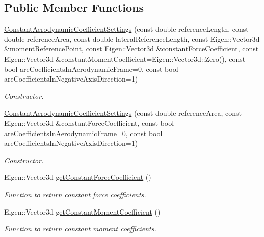 \subsection*{Public Member Functions}
\begin{DoxyCompactItemize}
\item 
\hyperlink{classtudat_1_1simulation__setup_1_1ConstantAerodynamicCoefficientSettings_ad9845f3663c017608d0f752aa43e3676}{Constant\+Aerodynamic\+Coefficient\+Settings} (const double reference\+Length, const double reference\+Area, const double lateral\+Reference\+Length, const Eigen\+::\+Vector3d \&moment\+Reference\+Point, const Eigen\+::\+Vector3d \&constant\+Force\+Coefficient, const Eigen\+::\+Vector3d \&constant\+Moment\+Coefficient=Eigen\+::\+Vector3d\+::\+Zero(), const bool are\+Coefficients\+In\+Aerodynamic\+Frame=0, const bool are\+Coefficients\+In\+Negative\+Axis\+Direction=1)
\begin{DoxyCompactList}\small\item\em Constructor. \end{DoxyCompactList}\item 
\hyperlink{classtudat_1_1simulation__setup_1_1ConstantAerodynamicCoefficientSettings_a4db8de40f3460d446d5cde28ca76fb36}{Constant\+Aerodynamic\+Coefficient\+Settings} (const double reference\+Area, const Eigen\+::\+Vector3d \&constant\+Force\+Coefficient, const bool are\+Coefficients\+In\+Aerodynamic\+Frame=0, const bool are\+Coefficients\+In\+Negative\+Axis\+Direction=1)
\begin{DoxyCompactList}\small\item\em Constructor. \end{DoxyCompactList}\item 
Eigen\+::\+Vector3d \hyperlink{classtudat_1_1simulation__setup_1_1ConstantAerodynamicCoefficientSettings_a547a9b0db4a387a8c294ed894019c243}{get\+Constant\+Force\+Coefficient} ()
\begin{DoxyCompactList}\small\item\em Function to return constant force coefficients. \end{DoxyCompactList}\item 
Eigen\+::\+Vector3d \hyperlink{classtudat_1_1simulation__setup_1_1ConstantAerodynamicCoefficientSettings_afd82801686ddc02865fa757b35341315}{get\+Constant\+Moment\+Coefficient} ()
\begin{DoxyCompactList}\small\item\em Function to return constant moment coefficients. \end{DoxyCompactList}\end{DoxyCompactItemize}


